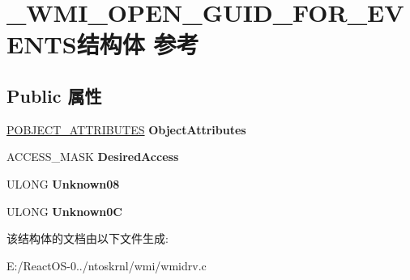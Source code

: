\hypertarget{struct___w_m_i___o_p_e_n___g_u_i_d___f_o_r___e_v_e_n_t_s}{}\section{\+\_\+\+W\+M\+I\+\_\+\+O\+P\+E\+N\+\_\+\+G\+U\+I\+D\+\_\+\+F\+O\+R\+\_\+\+E\+V\+E\+N\+T\+S结构体 参考}
\label{struct___w_m_i___o_p_e_n___g_u_i_d___f_o_r___e_v_e_n_t_s}
\subsection*{Public 属性}
\begin{DoxyCompactItemize}
\item 
\mbox{\label{struct___w_m_i___o_p_e_n___g_u_i_d___f_o_r___e_v_e_n_t_s_a2f0b66cb5bf5ffa4f7078b05b7f1ec4a}} 
\hyperlink{struct___o_b_j_e_c_t___a_t_t_r_i_b_u_t_e_s}{P\+O\+B\+J\+E\+C\+T\+\_\+\+A\+T\+T\+R\+I\+B\+U\+T\+ES} {\bfseries Object\+Attributes}
\item 
\mbox{\label{struct___w_m_i___o_p_e_n___g_u_i_d___f_o_r___e_v_e_n_t_s_a8dd925b3c2aa246e3312b96350f9cce5}} 
A\+C\+C\+E\+S\+S\+\_\+\+M\+A\+SK {\bfseries Desired\+Access}
\item 
\mbox{\label{struct___w_m_i___o_p_e_n___g_u_i_d___f_o_r___e_v_e_n_t_s_aaaabb37102ece693f14331afd0b5e2e0}} 
U\+L\+O\+NG {\bfseries Unknown08}
\item 
\mbox{\label{struct___w_m_i___o_p_e_n___g_u_i_d___f_o_r___e_v_e_n_t_s_afe48b1faa954ea435f399c9f374858db}} 
U\+L\+O\+NG {\bfseries Unknown0C}
\end{DoxyCompactItemize}


该结构体的文档由以下文件生成\+:\begin{DoxyCompactItemize}
\item 
E\+:/\+React\+O\+S-\/0../ntoskrnl/wmi/wmidrv.\+c\end{DoxyCompactItemize}
